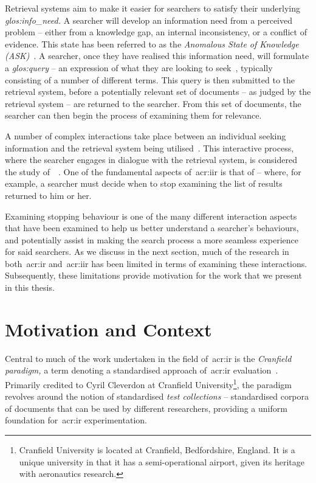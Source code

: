 Retrieval systems aim to make it easier for searchers to satisfy their underlying \emph{\gls{glos:info_need}.} A searcher will develop an information need from a perceived problem -- either from a knowledge gap, an internal inconsistency, or a conflict of evidence. This state has been referred to as the \emph{Anomalous State of Knowledge (ASK)}~\citep{belkin1980ask}. A searcher, once they have realised this information need, will formulate a \emph{\gls{glos:query}} -- an expression of what they are looking to seek~\citep{borlund2003iir_model}, typically consisting of a number of different terms. This query is then submitted to the retrieval system, before a potentially relevant set of documents -- as judged by the retrieval system -- are returned to the searcher. From this set of documents, the searcher can then begin the process of examining them for relevance.

A number of complex interactions take place between an individual seeking information and the retrieval system being utilised~\citep{ingwersen2005theturn}. This interactive process, where the searcher engages in dialogue with the retrieval system, is considered the study of~~\citep{borlund2003iir_model}. One of the fundamental aspects of~\gls{acr:iir} is that of  -- where, for example, a searcher must decide when to stop examining the list of results returned to him or her.

Examining stopping behaviour is one of the many different interaction aspects that have been examined to help us better understand a searcher's behaviours, and potentially assist in making the search process a more seamless experience for said searchers. As we discuss in the next section, much of the research in both~\gls{acr:ir} and~\gls{acr:iir} has been limited in terms of examining these interactions. Subsequently, these limitations provide motivation for the work that we present in this thesis.

\section{Motivation and Context}
Central to much of the work undertaken in the field of~\gls{acr:ir} is the \emph{Cranfield paradigm,} a term denoting a standardised approach of~\gls{acr:ir} evaluation~\citep{aslib1966factors}. Primarily credited to Cyril Cleverdon at Cranfield University\footnote{Cranfield University is located at Cranfield, Bedfordshire, England. It is a unique university in that it has a semi-operational airport, given its heritage with aeronautics research.}, the paradigm revolves around the notion of standardised \emph{test collections} -- standardised corpora of documents that can be used by different researchers, providing a uniform foundation for~\gls{acr:ir} experimentation.

